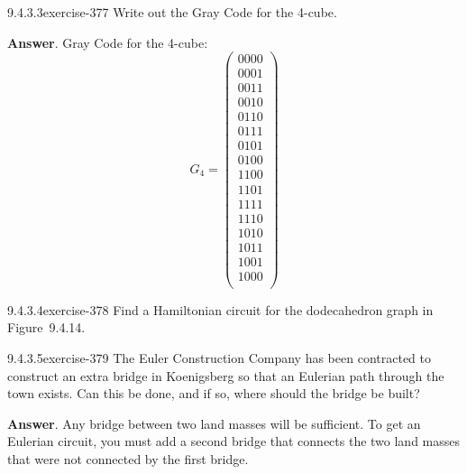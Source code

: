 \documentclass[twoside,10pt,]{book}
\numberwithin{equation}{section}
\begin{document}
\begin{divisionsolution}{9.4.3.3}{}{exercise-377}%
\hypertarget{p-3264}{}%
Write out the Gray Code for the 4-cube.%
\par\smallskip%
\noindent\textbf{Answer}.\quad%
\hypertarget{p-3265}{}%
Gray Code for the 4-cube:%
\begin{equation*}
G_4=\left(
\begin{array}{c}
0000 \\
0001 \\
0011 \\
0010 \\
0110 \\
0111 \\
0101 \\
0100 \\
1100 \\
1101 \\
1111 \\
1110 \\
1010 \\
1011 \\
1001 \\
1000 \\
\end{array}
\right)
\end{equation*}
%
\end{divisionsolution}%
\begin{divisionsolution}{9.4.3.4}{}{exercise-378}%
\hypertarget{p-3266}{}%
Find a Hamiltonian circuit for the dodecahedron graph in Figure~9.4.14.%
\end{divisionsolution}%
\begin{divisionsolution}{9.4.3.5}{}{exercise-379}%
\hypertarget{p-3267}{}%
The Euler Construction Company has been contracted to construct an extra bridge in Koenigsberg so that an Eulerian path through the town exists. Can this be done, and if so, where should the bridge be built?%
\par\smallskip%
\noindent\textbf{Answer}.\quad%
\hypertarget{p-3268}{}%
Any bridge between two land masses will be sufficient. To get an Eulerian circuit, you must add a second bridge that connects the two land masses that were not connected by the first bridge.%
\end{divisionsolution}%
\end{document}

